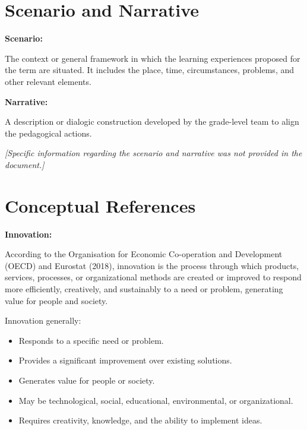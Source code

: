 \documentclass[12pt,a4paper]{article}
\newcommand{\placeholder}[1]{
	\textit{\textcolor{secondary}{[#1]}}
}
\begin{document}
	
	\section{Scenario and Narrative}
	
	\textbf{Scenario:}
	
	The context or general framework in which the learning experiences
	proposed for the term are situated. It includes the place, time,
	circumstances, problems, and other relevant elements.
	
	\textbf{Narrative:}
	
	A description or dialogic construction developed by the grade-level
	team to align the pedagogical actions.
	
	\placeholder{Specific information regarding the scenario and narrative
		was not provided in the document.}
	
	
	\section{Conceptual References}
	
	\textbf{Innovation:}
	
	According to the Organisation for Economic Co-operation and Development
	(OECD) and Eurostat (2018), innovation is the process through which
	products, services, processes, or organizational methods are created
	or improved to respond more efficiently, creatively, and sustainably
	to a need or problem, generating value for people and society.
	
	Innovation generally:
	
	\begin{itemize}
		
		\item Responds to a specific need or problem.
		
		\item Provides a significant improvement over existing solutions.
		
		\item Generates value for people or society.
		
		\item May be technological, social, educational, environmental,
		or organizational.
		
		\item Requires creativity, knowledge, and the ability to implement
		ideas.
		
	\end{itemize}
	
\end{document}
